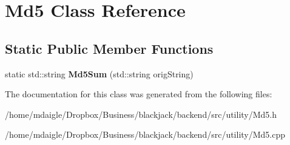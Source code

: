 \hypertarget{classMd5}{
\section{\-Md5 \-Class \-Reference}
\label{classMd5}
}
\subsection*{\-Static \-Public \-Member \-Functions}
\begin{DoxyCompactItemize}
\item 
\hypertarget{classMd5_a00168b527258bd57303819b74795f482}{
static std\-::string {\bfseries \-Md5\-Sum} (std\-::string orig\-String)}
\label{classMd5_a00168b527258bd57303819b74795f482}

\end{DoxyCompactItemize}


\-The documentation for this class was generated from the following files\-:\begin{DoxyCompactItemize}
\item 
/home/mdaigle/\-Dropbox/\-Business/blackjack/backend/src/utility/\-Md5.\-h\item 
/home/mdaigle/\-Dropbox/\-Business/blackjack/backend/src/utility/\-Md5.\-cpp\end{DoxyCompactItemize}
